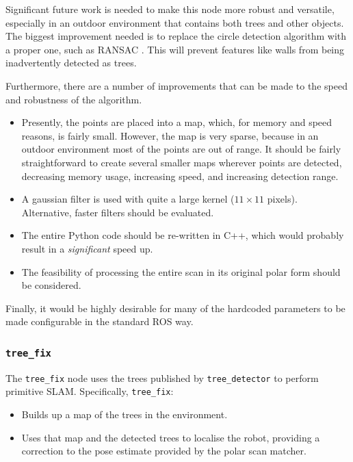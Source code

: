 \documentclass[12pt,oneside,a4paper]{book}
\begin{document}
Significant future work is needed to make this node more
robust and versatile, especially in an outdoor environment that
contains both trees and other objects. The biggest improvement needed
is to replace the circle detection algorithm with a proper one, such
as RANSAC . This will prevent features like walls from
being inadvertently detected as trees.

Furthermore, there are a number of improvements that can be made to
the speed and robustness of the algorithm.
\begin{itemize}
\item Presently, the points are placed into a map, which, for memory
  and speed reasons, is fairly small. However, the map is very sparse,
  because in an outdoor environment most of the points are out of range.
  It should be fairly straightforward to create several smaller maps
  wherever points are detected, decreasing memory usage, increasing
  speed, and increasing detection range.
\item A gaussian filter is used with quite a large kernel ($11 \times
  11$ pixels). Alternative, faster filters should be evaluated.
\item The entire Python code should be re-written in C++, which would
  probably result in a \emph{significant} speed up.
\item The feasibility of processing the entire scan in its original
  polar form should be considered. 
\end{itemize}

Finally, it would be highly desirable for many of the hardcoded
parameters to be made configurable in the standard ROS way.

\subsubsection{\texttt{tree\_fix}}
\label{sec:tree_fix}

The \texttt{tree\_fix} node uses the trees published by
\texttt{tree\_detector} to perform primitive SLAM. Specifically, \texttt{tree\_fix}:
\begin{itemize}
\item Builds up a map of the trees in the environment.
\item Uses that map and the detected trees to localise the robot,
  providing a correction to the pose estimate provided by the polar
  scan matcher.
\end{itemize}
\end{document}
